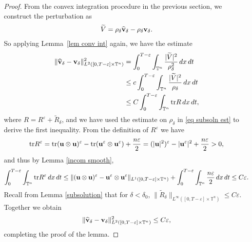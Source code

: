 \documentclass[12pt,reqno]{amsart}
\theoremstyle{definition}
\theoremstyle{remark}
\numberwithin{equation}{section}
\renewcommand{\u}{{\bf u}}
\newcommand{\tr}{{\rm tr}}
\newcommand{\trace}{\mathrm{tr}}
\renewcommand{\v}{{\bf v}}
\newcommand{\eps}{{\varepsilon}}
\begin{document}
\begin{proof}
From the convex integration procedure in the previous section, we construct the perturbation as
\[
\widetilde{V} = \rho_\delta \widehat{\v}_{\delta} - \rho_\delta \v_{\delta}.
\]
So applying Lemma~\ref{lem conv int} again, we have the estimate
\begin{align*}
\| \widehat{\v}_{\delta} - \v_{\delta} \|^2_{L^2([0,T - \eps] \times \mathbb{T}^n)} &= \int_0^{T- \eps}\int_{\mathbb{T}^n} \frac{|\widetilde{V}|^2}{\rho_\delta^2} \, dx\,dt \\
&\leq c \int_0^{T- \eps}\int_{\mathbb{T}^n} \frac{|\widetilde{V}|^2}{\rho_\delta} \, dx\,dt \\
& \leq C \int_0^{T - \eps}\int_{\mathbb{T}^n} \trace R \, dx\,dt,
\end{align*}
where $ R = R^{\varepsilon} + \tilde{R}_{\delta}$, and we have used the estimate on $\rho_\delta$ in \eqref{eq subsoln est} to derive the first inequality. From the definition of $R^\eps$ we have
\[
\tr R^\eps = \tr (\u \otimes \u)^\eps - \tr (\u^\eps \otimes \u^\eps) + \frac{n \eps}{2} = (|\u|^2)^\eps - |\u^\eps|^2 + \frac{n \eps}{2} > 0,
\]
and thus by Lemma \ref{incom smooth},
\[
\int_0^{T - \eps}\int_{\mathbb{T}^n} \trace R^\eps \, dx\,dt \le \|(\u\otimes \u)^{\varepsilon}-\u^\eps \otimes \u^\eps\|_{L^1([0,T -\eps] \times \mathbb{T}^n)} + \int_0^{T - \eps}\int_{\mathbb{T}^n} \frac{n \eps}{2} \, dx\,dt \le C \eps. 
\]
Recall from Lemma \ref{subsolution} that for $\delta < \delta_0$,  $ \| \tilde{R}_\delta \|_{{L^\infty([0,T - \eps] \times \mathbb{T}^n)}} \leq C \varepsilon $. Together we obtain
\[
\| \widehat{\v}_{\delta} - \v_{\delta} \|^2_{L^{2}([0,T - \eps] \times \mathbb{T}^n)} \leq C \varepsilon,
\]
completing the proof of the lemma. 
\end{proof}
\end{document}
